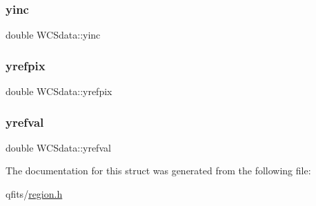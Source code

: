 \mbox{\label{struct_w_c_sdata_ad913189530c9b25c0cf3c54e965f9467}} 
\subsubsection{\texorpdfstring{yinc}{yinc}}
{\footnotesize\ttfamily double W\+C\+Sdata\+::yinc}

\mbox{\label{struct_w_c_sdata_a69536087b489da498aa37e80bfdcf931}} 
\subsubsection{\texorpdfstring{yrefpix}{yrefpix}}
{\footnotesize\ttfamily double W\+C\+Sdata\+::yrefpix}

\mbox{\label{struct_w_c_sdata_a782ed4e56739fdd59b4d54cdbdb5a258}} 
\subsubsection{\texorpdfstring{yrefval}{yrefval}}
{\footnotesize\ttfamily double W\+C\+Sdata\+::yrefval}



The documentation for this struct was generated from the following file\+:\begin{DoxyCompactItemize}
\item 
qfits/\hyperlink{region_8h}{region.\+h}\end{DoxyCompactItemize}

